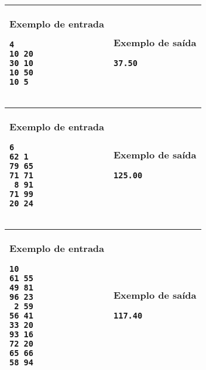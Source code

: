 \newpage
\begin{table}[!h]
\centering
\begin{tabular}{|l|l|}
\hline
\begin{minipage}[t]{3in}
\textbf{Exemplo de entrada}
\begin{verbatim}
4
10 20
30 10
10 50
10 5
\end{verbatim}
\vspace{1mm}
\end{minipage}
&
\begin{minipage}[t]{3in}
\textbf{Exemplo de saída}
\begin{verbatim}
37.50
\end{verbatim}
\vspace{1mm}
\end{minipage} \\
\hline
\end{tabular}
\end{table}

\begin{table}[!h]
\centering
\begin{tabular}{|l|l|}
\hline
\begin{minipage}[t]{3in}
\textbf{Exemplo de entrada}
\begin{verbatim}
6
62 1
79 65
71 71
 8 91
71 99
20 24
\end{verbatim}
\vspace{1mm}
\end{minipage}
&
\begin{minipage}[t]{3in}
\textbf{Exemplo de saída}
\begin{verbatim}
125.00
\end{verbatim}
\vspace{1mm}
\end{minipage} \\
\hline
\end{tabular}
\end{table}

\begin{table}[!h]
\centering
\begin{tabular}{|l|l|}
\hline
\begin{minipage}[t]{3in}
\textbf{Exemplo de entrada}
\begin{verbatim}
10
61 55
49 81
96 23
 2 59
56 41
33 20
93 16
72 20
65 66
58 94
\end{verbatim}
\vspace{1mm}
\end{minipage}
&
\begin{minipage}[t]{3in}
\textbf{Exemplo de saída}
\begin{verbatim}
117.40
\end{verbatim}
\vspace{1mm}
\end{minipage} \\
\hline
\end{tabular}
\end{table}
